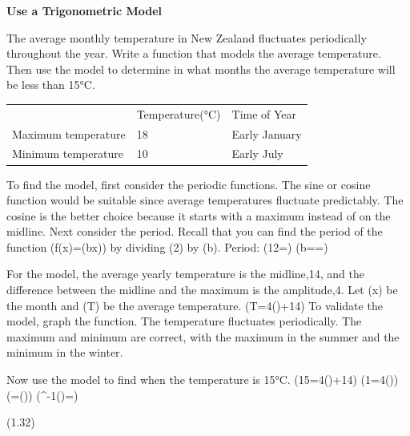 \documentclass{article}
\newenvironment{example}[1]{}{}         %
\newcommand{\placeholder}[2]{}          %
\newcommand{\te}[1]{}                   %
\begin{document}
\begin{example}{5}
\textbf{Use a Trigonometric Model}
\te{APPLICATION}
The average monthly temperature in New Zealand fluctuates periodically throughout the year. Write a function that models the average temperature. Then use the model to determine in what months the average temperature will be less than 15°C.
\begin{tabular}{lll}
 & Temperature(°C) & Time of Year \\
Maximum temperature & 18 & Early January \\
Minimum temperature & 10 & Early July \\
\end{tabular}
\placeholder{photo}{Sheep in grassy NewZealand pasture,treesandsnowcappedmountains behind; temperature table overlaysuppermiddle.}
\te{CONTINUED ON THE NEXT PAGE}
To find the model, first consider the periodic functions. The sine or cosine function would be suitable since average temperatures fluctuate predictably. The cosine is the better choice because it starts with a maximum instead of on the midline. Next consider the period.
Recall that you can find the period of the function (f(x)=\cos(bx)) by dividing (2\pi) by (b).
Period: (12=)
(b==\frac{})
\te{Callout: Since we are looking at the temperature over one year, a period of 12 (or 12 months) makes sense.}
For the model, the average yearly temperature is the midline,14, and the difference between the midline and the maximum is the amplitude,4.
Let (x) be the month and (T) be the average temperature.
(T=4\cos()+14)
To validate the model, graph the function. The temperature fluctuates periodically. The maximum and minimum are correct, with the maximum in the summer and the minimum in the winter.
\placeholder{graph}{RedcosinetemperaturecurveT=4cos(pi x/6)+14,onblackpositivearrowedx,yaxes;horizontalgrid1month withverticalJan,Feb,Mar,Apr,May,June,July,Aug,Sep,Oct,Nov,Dec labels atx0..11,window0..12;verticalgrid5 labels0,10,20,window0..25. Maximum(0,18),minimum(6,10),returnto18atrightedge;noendpointmarkers.}
Now use the model to find when the temperature is 15°C.
(15=4\cos()+14)
(1=4\cos())
(=\cos())
(\cos^{-1}()=)
\te{Callout: Start to isolate x by subtracting 14 from both sides. HAVE A GROWTH MINDSET How can you take on challenges with positivity?}
(1.32\approx{}\quad{}\approx{})

\end{example}
\end{document}
